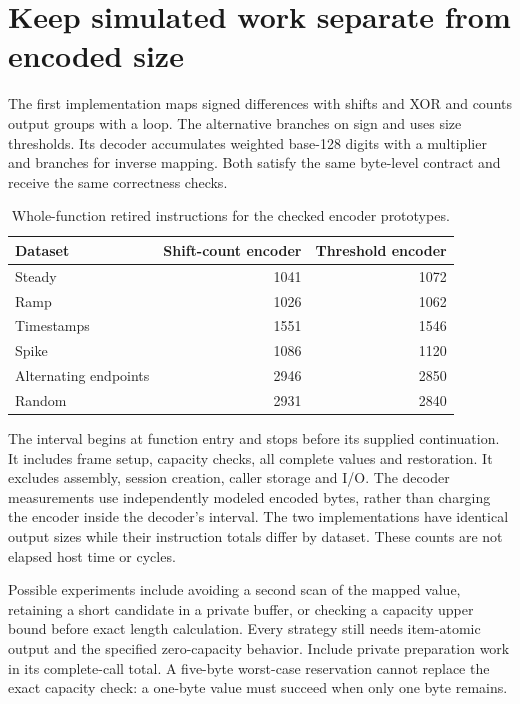 \section{Keep simulated work separate from encoded size}
The first implementation maps signed differences with shifts and XOR and counts output
groups with a loop. The alternative branches on sign and uses size thresholds. Its
decoder accumulates weighted base-128 digits with a multiplier and branches for inverse
mapping. Both satisfy the same byte-level contract and receive the same correctness
checks.

\begin{table}[htbp]
  \centering
  \caption{Whole-function retired instructions for the checked encoder prototypes.}
  \begin{tabular}{lrr}
    \toprule
    Dataset               & Shift-count encoder & Threshold encoder \\
    \midrule
    Steady                & 1041                & 1072              \\
    Ramp                  & 1026                & 1062              \\
    Timestamps            & 1551                & 1546              \\
    Spike                 & 1086                & 1120              \\
    Alternating endpoints & 2946                & 2850              \\
    Random                & 2931                & 2840              \\
    \bottomrule
  \end{tabular}
\end{table}

The interval begins at function entry and stops before its supplied continuation.
It includes frame setup, capacity checks, all complete values and restoration. It
excludes assembly, session creation, caller storage and I/O. The decoder measurements
use independently modeled encoded bytes, rather than charging the encoder inside the
decoder's interval. The two implementations have identical output sizes while their
instruction totals differ by dataset. These counts are not elapsed host time or cycles.

Possible experiments include avoiding a second scan of the mapped value, retaining a
short candidate in a private buffer, or checking a capacity upper bound before exact
length calculation. Every strategy still needs item-atomic output and the specified
zero-capacity behavior. Include private preparation work in its complete-call total.
A five-byte worst-case reservation cannot replace the exact capacity check: a one-byte
value must succeed when only one byte remains.
